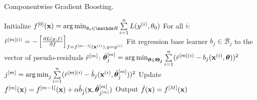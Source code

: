 
\begin{algorithm}[H]
  \begin{footnotesize}
  \begin{center}
  \caption{Componentwise Gradient Boosting.}\color{gray}
    \begin{algorithmic}[1]
      \State Initialize $\fm[0](\xv) = \argmin_{\theta_0\in\R} \sum  \limits_{i=1}^n L(\yi, \theta_0)$
        \State For all $i$: $\tilde{r}^{[m](i)} = -\left[\frac{\partial{L(y, f)}}{\partial f}\right]_{f=f^{[m-1]}(\mathbf{x}^{(i)}),y=y^{(i)}}$
        \color{algocol}
          \State Fit regression base learner $b_j \in \mathcal{B}_j$ to the vector of pseudo-residuals $\tilde{r}^{[m]}$:
          \State $\hat{\bm{\theta}}^{[m]}_j = \operatorname*{arg\,min}_{\bm{\theta} \in \bm{\Theta_j}} \sum  \limits_{i=1}^n
          (\tilde{r}^{[m](i)} - b_j(\mathbf{x}^{(i)}, \bm{\theta}))^2$
        \EndFor
        \State $j^{[m]} = \operatorname*{arg\,min}_{j} \sum  \limits_{i=1}^n (\tilde{r}^{[m](i)} - \hat{b}_j(\mathbf{x}^{(i)}, \hat{\bm{\theta}}^{[m]}_j))^2$
        \color{lightgray}
        \State Update $f^{[m]}(\mathbf{x}) = f^{[m-1]}(\mathbf{x}) + \alpha \hat{b}_{\hat{j}}(\mathbf{x}, \hat{\bm{\theta}}^{[m]}_{j^{[m]}})$
      \EndFor
      \State Output $\hat{f}(\mathbf{x}) = f^{[M]}(\mathbf{x})$
    \end{algorithmic}
    \end{center}
    \end{footnotesize}
    \color{black}
\end{algorithm}
